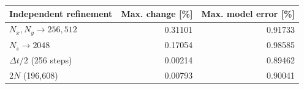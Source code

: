 \begin{tabular}{lrr}
\toprule
Independent refinement & Max. change [\%] & Max. model error [\%] \\
\midrule
$N_x,N_y\to 256,512$ & 0.31101 & 0.91733 \\
$N_s\to 2048$ & 0.17054 & 0.98585 \\
$\Delta t/2$ (256 steps) & 0.00214 & 0.89462 \\
$2N$ (196,608) & 0.00793 & 0.90041 \\
\bottomrule
\end{tabular}
